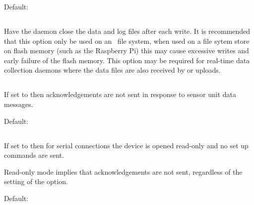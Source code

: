 Default: 

\subsection{}
Have the daemon close the data and log files after each write. It is
recommended that this option only be used on an \nfs\ file system,
when used on a file sytem store on flash memory (such as the Raspberry
Pi) this may cause excessive writes and early failure of the flash
memory. This option may be required for real-time data collection
daemons where the data files are also received by  or
 uploads.

\subsection{}
If set to  then acknowledgements are not sent in response
to sensor unit data messages.

Default: 

\subsection{}
If set to  then for serial connections the device is opened
read-only and no set up commands are sent.

Read-only mode implies that acknowledgements are not sent, regardless
of the setting of the  option.

Default: 

